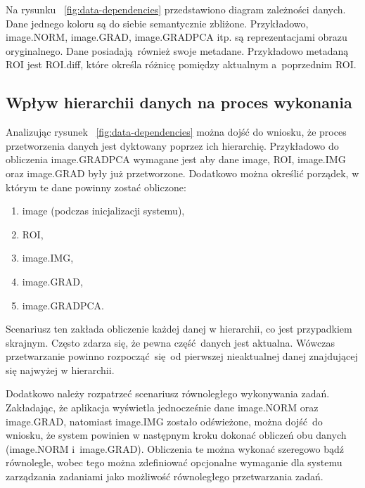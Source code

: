 
Na rysunku ~\ref{fig:data-dependencies} przedstawiono diagram zależności danych. Dane jednego koloru są do siebie semantycznie zbliżone. Przykładowo, image.NORM, image.GRAD, image.GRADPCA itp. są reprezentacjami obrazu oryginalnego. Dane posiadają również swoje metadane. Przykładowo metadaną ROI jest ROI.diff, które określa różnicę pomiędzy aktualnym a~poprzednim ROI. 

\subsection{Wpływ hierarchii danych na proces wykonania}
Analizując rysunek ~\ref{fig:data-dependencies} można dojść do wniosku, że proces przetworzenia danych jest dyktowany poprzez ich hierarchię. Przykładowo do obliczenia image.GRADPCA wymagane jest aby dane image, ROI, image.IMG oraz image.GRAD były już przetworzone. Dodatkowo można określić porządek, w którym te dane powinny zostać obliczone:

\begin{enumerate}[labelwidth=\widthof{\ref{last-item}},label=\arabic*.]
	\item image (podczas inicjalizacji systemu),
	\item ROI,
	\item image.IMG,
	\item image.GRAD,
	\item image.GRADPCA. \label{last-item}
\end{enumerate}

Scenariusz ten zakłada obliczenie każdej danej w hierarchii, co jest przypadkiem skrajnym. Często zdarza się, że pewna część danych jest aktualna. Wówczas przetwarzanie powinno rozpocząć się od pierwszej nieaktualnej danej znajdującej się najwyżej w hierarchii. 

Dodatkowo należy rozpatrzeć scenariusz równoległego wykonywania zadań. Zakładając, że aplikacja wyświetla jednocześnie dane image.NORM oraz image.GRAD, natomiast image.IMG zostało odświeżone, można dojść do wniosku, że system powinien w następnym kroku dokonać obliczeń obu danych (image.NORM i~image.GRAD). Obliczenia te można wykonać szeregowo bądź równolegle, wobec tego można zdefiniować opcjonalne wymaganie dla systemu zarządzania zadaniami jako możliwość równoległego przetwarzania zadań.
